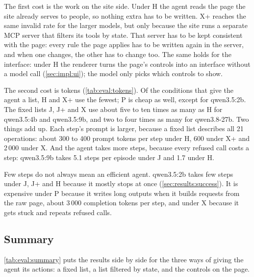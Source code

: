 The first cost is the work on the site side.
Under H the agent reads the page the site already serves to people, so nothing extra has to be written.
X+ reaches the same invalid rate for the larger models, but only because the site runs a separate MCP server that filters its tools by state.
That server has to be kept consistent with the page: every rule the page applies has to be written again in the server, and when one changes, the other has to change too.
The same holds for the interface: under H the renderer turns the page's controls into an interface without a model call (\autoref{sec:impl:ui}); the model only picks which controls to show.

The second cost is tokens (\autoref{tab:eval:tokens}).
Of the conditions that give the agent a list, H and X+ use the fewest; P is cheap as well, except for qwen3.5:2b.
The fixed lists J, J+ and X use about five to ten times as many as H for qwen3.5:4b and qwen3.5:9b, and two to four times as many for qwen3.8-27b. Two things add up.
Each step's prompt is larger, because a fixed list describes all 21 operations: about 300 to 400 prompt tokens per step under H, 600 under X+ and 2\,000 under X. And the agent takes more steps, because every refused call costs a step: qwen3.5:9b takes 5.1 steps per episode under J and 1.7 under H.

Few steps do not always mean an efficient agent. qwen3.5:2b takes few steps under J, J+ and H because it mostly stops at once (\autoref{sec:results:success}).
It is expensive under P because it writes long outputs when it builds requests from the raw page, about 3\,000 completion tokens per step, and under X because it gets stuck and repeats refused calls.


\FloatBarrier

\subsection{Summary}\label{sec:results:summary}

\autoref{tab:eval:summary} puts the results side by side for the three ways of giving the agent its actions: a fixed list, a list filtered by state, and the controls on the page.


